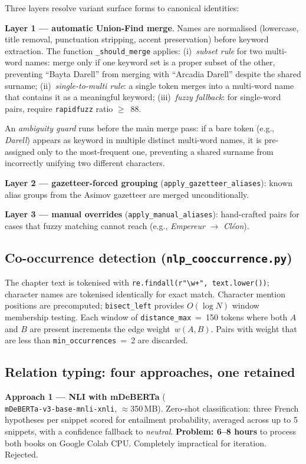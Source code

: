 \documentclass[a4paper]{article}
\begin{document}
Three layers resolve variant surface forms to canonical identities:

\textbf{Layer 1 --- automatic Union-Find merge}. Names are normalised
(lowercase, title removal, punctuation stripping, accent preservation)
before keyword extraction. The function \texttt{\_should\_merge} applies:
(i)~\textit{subset rule} for two multi-word names: merge only if one
keyword set is a proper subset of the other, preventing ``Bayta Darell''
from merging with ``Arcadia Darell'' despite the shared surname;
(ii)~\textit{single-to-multi rule}: a single token merges into a multi-word
name that contains it as a meaningful keyword;
(iii)~\textit{fuzzy fallback}: for single-word pairs, require
\texttt{rapidfuzz} ratio $\geq$~88.

An \textit{ambiguity guard} runs before the main merge pass: if a bare
token (e.g., \textit{Darell}) appears as keyword in multiple distinct
multi-word names, it is pre-assigned only to the most-frequent one,
preventing a shared surname from incorrectly unifying two different characters.

\textbf{Layer 2 --- gazetteer-forced grouping}
(\texttt{apply\_gazetteer\_aliases}): known alias groups from the
Asimov gazetteer are merged unconditionally.

\textbf{Layer 3 --- manual overrides}
(\texttt{apply\_manual\_aliases}): hand-crafted pairs for cases
that fuzzy matching cannot reach
(e.g., \textit{Empereur} $\to$ \textit{Cléon}).

\subsection{Co-occurrence detection (\texttt{nlp\_cooccurrence.py})}

The chapter text is tokenised with \texttt{re.findall(r"\textbackslash{}w+",
text.lower())}; character names are tokenised identically for exact match.
Character mention positions are precomputed; \texttt{bisect\_left} provides
$O(\log N)$ window membership testing. Each window of \texttt{distance\_max}~=~150
tokens where both $A$ and $B$ are present increments the edge weight~$w(A,B)$.
Pairs with weight that are less than \texttt{min\_occurrences}~=~2 are discarded.

\subsection{Relation typing: four approaches, one retained}

\textbf{Approach 1 --- NLI with mDeBERTa} (\texttt{\\
mDeBERTa-v3-base-mnli-xnli}, $\approx$350\,MB).
Zero-shot classification: three French hypotheses per snippet scored
for entailment probability, averaged across up to 5 snippets, with
a confidence fallback to \textit{neutral}.
\textbf{Problem: 6--8 hours} to process both books on Google Colab CPU.
Completely impractical for iteration. Rejected.
\end{document}
